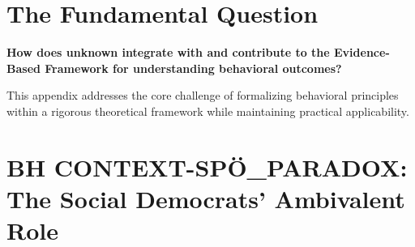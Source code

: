 %
%

\section{The Fundamental Question}
\label{sec:bh-fundamental}

\begin{tcolorbox}[
    colback=red!5!white,
    colframe=red!75!black,
    title={\textbf{Fundamental Question}}
]
\textbf{How does unknown integrate with and contribute to the
Evidence-Based Framework for understanding behavioral outcomes?}

This appendix addresses the core challenge of formalizing behavioral principles
within a rigorous theoretical framework while maintaining practical applicability.
\end{tcolorbox}


\section{BH CONTEXT-SPÖ_PARADOX: The Social Democrats' Ambivalent Role}
\label{app:bh-spoe-paradox}


